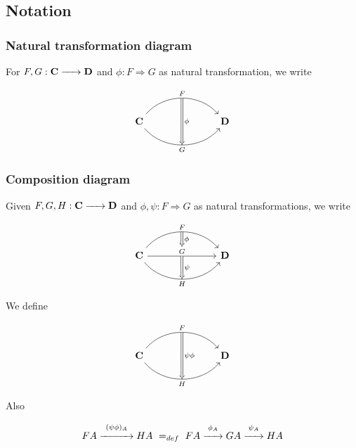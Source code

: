 \documentclass{article}
\renewcommand{\to}{\xrightarrow{\hspace{0.5cm}}}  %
\begin{document}
    \subsection{Notation}

    \subsubsection{Natural transformation diagram}

    For \(F, G: \mathbf{C} \to \mathbf{D}\) and \(\phi: F \Rightarrow G\) as natural transformation, we write

    \[
        \begin{tikzcd}[column sep=7em, row sep=4em]
            \mathbf{C} \arrow[r, bend left=50, "F"{name=F, above}]
            \arrow[r, bend right=50, "G"{name=G, below}]
            & \mathbf{D}
            \arrow[Rightarrow, from=F, to=G, "\phi"]
        \end{tikzcd}
    \]

    \subsubsection{Composition diagram}

    Given \(F, G, H: \mathbf{C} \to \mathbf{D}\) and \(\phi, \psi: F \Rightarrow G\) as natural transformations, we write

    \[
        \begin{tikzcd}[column sep=7em, row sep=4em]
            \mathbf{C} \arrow[r, bend left=50, "F"{name=F, above}]
            \arrow[r, "G"{name=G, above}]
            \arrow[r, bend right=50, "H"{name=H, below}]
            & \mathbf{D}
            \arrow[Rightarrow, from=F, to=G, "\phi"]
            \arrow[Rightarrow, from=G, to=H, "\psi"]
        \end{tikzcd}
    \]

    We define

    \[
        \begin{tikzcd}[column sep=7em, row sep=4em]
            \mathbf{C} \arrow[r, bend left=50, "F"{name=F, above}]
            \arrow[r, bend right=50, "H"{name=H, below}]
            & \mathbf{D}
            \arrow[Rightarrow, from=F, to=H, "\psi\phi"]
        \end{tikzcd}
    \]

    Also

    \[
        FA \stackrel{(\psi\phi)_A}{\xrightarrow{\hspace{1cm}}} HA \ =_{def} \ FA \stackrel{\phi_A}{\to} GA \stackrel{\psi_A}{\to} HA
    \]
\end{document}
